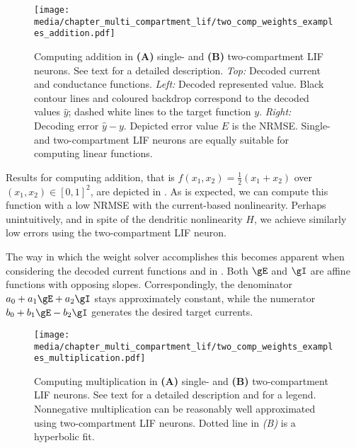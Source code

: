 \begin{figure}
	\centering
	\texttt{[image: media/chapter\_multi\_compartment\_lif/two\_comp\_weights\_examples\_addition.pdf]}%
	{\label{fig:two_comp_weights_examples_addition_a}}%
	{\label{fig:two_comp_weights_examples_addition_b}}%
	\caption[Computing addition in single- and two-compartment LIF neurons]{Computing addition in \textbf{(A)} single- and \textbf{(B)} two-compartment LIF neurons. See text for a detailed description. \emph{Top:} Decoded current and conductance functions. \emph{Left:} Decoded represented value. Black contour lines and coloured backdrop correspond to the decoded values $\hat y$; dashed white lines to the target function $y$. \emph{Right:} Decoding error $\hat y - y$. Depicted error value $E$ is the NRMSE.
	Single- and two-compartment LIF neurons are equally suitable for computing linear functions.
	}
	\label{fig:two_comp_weights_examples_addition}
\end{figure}

Results for computing addition, that is $f(x_1, x_2) = \frac{1}2 (x_1 + x_2)$ over $(x_1, x_2) \in [0, 1]^2$, are depicted in .
As is expected, we can compute this function with a low NRMSE with the current-based nonlinearity.
Perhaps unintuitively, and in spite of the dendritic nonlinearity $H$, we achieve similarly low errors using the two-compartment LIF neuron.

The way in which the weight solver accomplishes this becomes apparent when considering the decoded current functions \gE and \gI in .
Both $\gE$ and $\gI$ are affine functions with opposing slopes.
Correspondingly, the denominator $a_0 + a_1 \gE + a_2 \gI$ stays approximately constant, while the numerator $b_0 + b_1 \gE - b_2 \gI$ generates the desired target currents.


\begin{figure}
	\centering
	\texttt{[image: media/chapter\_multi\_compartment\_lif/two\_comp\_weights\_examples\_multiplication.pdf]}%
	{\label{fig:two_comp_weights_examples_multiplication_a}}%
	{\label{fig:two_comp_weights_examples_multiplication_b}}%
	\caption[Computing multiplication in single- and two-compartment LIF neurons]{Computing multiplication in \textbf{(A)} single- and \textbf{(B)} two-compartment LIF neurons. See text for a detailed description and  for a legend. Nonnegative multiplication can be reasonably well approximated using two-compartment LIF neurons. Dotted line in \emph{(B)} is a hyperbolic fit.
	}
	\label{fig:two_comp_weights_examples_multiplication}
\end{figure}

